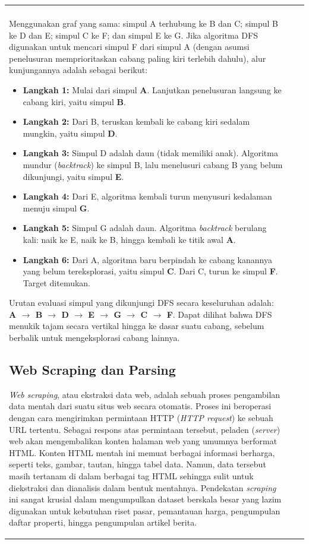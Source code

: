 \documentclass[12pt]{article}
\begin{document}
\begin{table}[H]
\begin{tabular}{|l|c|c|}
\begin{document}
\vspace{0.3cm}
\noindent\textbf{Contoh Penelusuran DFS pada Graf:} \\
Menggunakan graf yang sama: simpul A terhubung ke B dan C; simpul B ke D dan E; simpul C ke F; dan simpul E ke G. Jika algoritma DFS digunakan untuk mencari simpul F dari simpul A (dengan asumsi penelusuran memprioritaskan cabang paling kiri terlebih dahulu), alur kunjungannya adalah sebagai berikut:
\begin{itemize}
    \item \textbf{Langkah 1:} Mulai dari simpul \textbf{A}. Lanjutkan penelusuran langsung ke cabang kiri, yaitu simpul \textbf{B}.
    \item \textbf{Langkah 2:} Dari B, teruskan kembali ke cabang kiri sedalam mungkin, yaitu simpul \textbf{D}.
    \item \textbf{Langkah 3:} Simpul D adalah daun (tidak memiliki anak). Algoritma mundur (\textit{backtrack}) ke simpul B, lalu menelusuri cabang B yang belum dikunjungi, yaitu simpul \textbf{E}.
    \item \textbf{Langkah 4:} Dari E, algoritma kembali turun menyusuri kedalaman menuju simpul \textbf{G}.
    \item \textbf{Langkah 5:} Simpul G adalah daun. Algoritma \textit{backtrack} berulang kali: naik ke E, naik ke B, hingga kembali ke titik awal \textbf{A}. 
    \item \textbf{Langkah 6:} Dari A, algoritma baru berpindah ke cabang kanannya yang belum tereksplorasi, yaitu simpul \textbf{C}. Dari C, turun ke simpul \textbf{F}. Target ditemukan.
\end{itemize}
Urutan evaluasi simpul yang dikunjungi DFS secara keseluruhan adalah: \textbf{A $\rightarrow$ B $\rightarrow$ D $\rightarrow$ E $\rightarrow$ G $\rightarrow$ C $\rightarrow$ F}. Dapat dilihat bahwa DFS menukik tajam secara vertikal hingga ke dasar suatu cabang, sebelum berbalik untuk mengeksplorasi cabang lainnya.
\subsection{Web Scraping dan Parsing}

\textit{Web scraping}, atau ekstraksi data web, adalah sebuah proses pengambilan data mentah dari suatu situs web secara otomatis. Proses ini beroperasi dengan cara mengirimkan permintaan HTTP (\textit{HTTP request}) ke sebuah URL tertentu. Sebagai respons atas permintaan tersebut, peladen (\textit{server}) web akan mengembalikan konten halaman web yang umumnya berformat HTML. Konten HTML mentah ini memuat berbagai informasi berharga, seperti teks, gambar, tautan, hingga tabel data. Namun, data tersebut masih tertanam di dalam berbagai tag HTML sehingga sulit untuk diekstraksi dan dianalisis dalam bentuk mentahnya. Pendekatan \textit{scraping} ini sangat krusial dalam mengumpulkan dataset berskala besar yang lazim digunakan untuk kebutuhan riset pasar, pemantauan harga, pengumpulan daftar properti, hingga pengumpulan artikel berita. 


\end{document}
\end{tabular}
\end{table}
\end{document}
